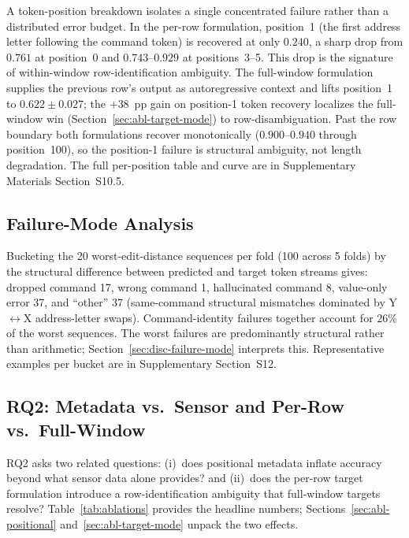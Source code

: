 \documentclass[sensors,article,submit,moreauthors,pdftex]{Definitions/mdpi}
\begin{document}
A token-position breakdown isolates a single concentrated failure rather than a distributed error budget. In the per-row formulation, position~1 (the first address letter following the command token) is recovered at only $0.240$, a sharp drop from $0.761$ at position~0 and $0.743$--$0.929$ at positions~3--5. This drop is the signature of within-window row-identification ambiguity. The full-window formulation supplies the previous row's output as autoregressive context and lifts position~1 to $0.622 \pm 0.027$; the $+38$~pp gain on position-1 token recovery localizes the full-window win (Section~\ref{sec:abl-target-mode}) to row-disambiguation. Past the row boundary both formulations recover monotonically ($0.900$--$0.940$ through position~100), so the position-1 failure is structural ambiguity, not length degradation. The full per-position table and curve are in Supplementary Materials Section~S10.5.

\subsection{Failure-Mode Analysis}
\label{sec:failure-modes}

Bucketing the 20 worst-edit-distance sequences per fold (100 across 5 folds) by the structural difference between predicted and target token streams gives: dropped command 17, wrong command 1, hallucinated command 8, value-only error 37, and ``other'' 37 (same-command structural mismatches dominated by Y$\leftrightarrow$X address-letter swaps). Command-identity failures together account for $26\%$ of the worst sequences. The worst failures are predominantly structural rather than arithmetic; Section~\ref{sec:disc-failure-mode} interprets this. Representative examples per bucket are in Supplementary Section~S12.

\subsection{RQ2: Metadata vs.\ Sensor and Per-Row vs.\ Full-Window}
\label{sec:results-rq2}

RQ2 asks two related questions: (i)~does positional metadata inflate accuracy beyond what sensor data alone provides? and (ii)~does the per-row target formulation introduce a row-identification ambiguity that full-window targets resolve? Table~\ref{tab:ablations} provides the headline numbers; Sections~\ref{sec:abl-positional} and~\ref{sec:abl-target-mode} unpack the two effects.


\end{document}
